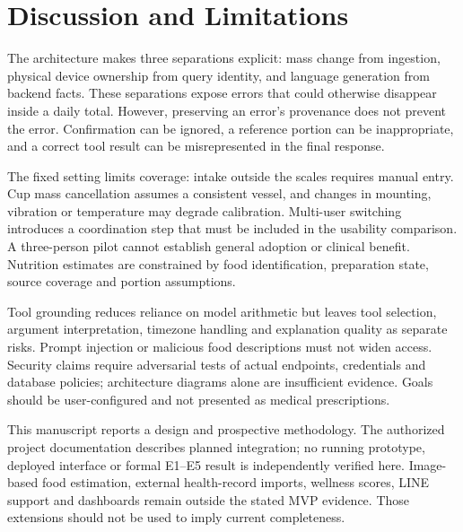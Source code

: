 \section{Discussion and Limitations}\label{sec:discussion}
The architecture makes three separations explicit: mass change from ingestion, physical device ownership from query identity, and language generation from backend facts. These separations expose errors that could otherwise disappear inside a daily total. However, preserving an error's provenance does not prevent the error. Confirmation can be ignored, a reference portion can be inappropriate, and a correct tool result can be misrepresented in the final response.

The fixed setting limits coverage: intake outside the scales requires manual entry. Cup mass cancellation assumes a consistent vessel, and changes in mounting, vibration or temperature may degrade calibration. Multi-user switching introduces a coordination step that must be included in the usability comparison. A three-person pilot cannot establish general adoption or clinical benefit. Nutrition estimates are constrained by food identification, preparation state, source coverage and portion assumptions.

Tool grounding reduces reliance on model arithmetic but leaves tool selection, argument interpretation, timezone handling and explanation quality as separate risks. Prompt injection or malicious food descriptions must not widen access. Security claims require adversarial tests of actual endpoints, credentials and database policies; architecture diagrams alone are insufficient evidence. Goals should be user-configured and not presented as medical prescriptions.

This manuscript reports a design and prospective methodology. The authorized project documentation describes planned integration; no running prototype, deployed interface or formal E1--E5 result is independently verified here. Image-based food estimation, external health-record imports, wellness scores, LINE support and dashboards remain outside the stated MVP evidence. Those extensions should not be used to imply current completeness.
